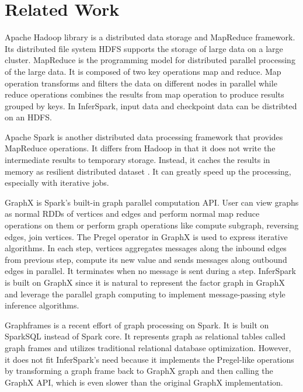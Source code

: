 
\chapter{Related Work}
\label{chap:related}

Apache Hadoop library  is a distributed data storage and
MapReduce framework. Its distributed file system HDFS supports the storage of
large data on a large cluster. MapReduce  is the programming model for
distributed parallel processing of the large data. It is composed of two key
operations map and reduce. Map operation transforms and filters the data on
different nodes in parallel while reduce operations combines the results from
map operation to produce results grouped by keys. In InferSpark, input data and
checkpoint data can be distribted on an HDFS.

Apache Spark is another distributed data processing framework that provides MapReduce
operations. It differs from Hadoop in that it does not write the intermediate
results to temporary storage. Instead, it caches the results in memory as
resilient distributed dataset . It
can greatly speed up the processing, especially with iterative jobs.

GraphX  is Spark's built-in graph
parallel computation API. User can view graphs as normal RDDs of vertices and
edges and perform normal map reduce operations on them or perform graph
operations like compute subgraph, reversing edges, join vertices. The Pregel
operator in GraphX is used to express iterative algorithms. In each step,
vertices aggregates messages along the inbound edges from previous step,
compute its new value and sends messages along outbound edges in parallel. It
terminates when no message is sent during a step. InferSpark is built on
GraphX since it is natural to represent the factor graph in GraphX and
leverage the parallel graph computing to implement message-passing style
inference algorithms. 

Graphframes  is a recent effort of graph processing on Spark. It is built on
SparkSQL instead of Spark core. It represents graph as relational tables
called graph frames and utilizes traditional relational database optimization.
However, it does not fit InferSpark's need because it implements the
Pregel-like operations by transforming a graph frame back to GraphX graph and
then calling the GraphX API, which is even slower than the original GraphX
implementation.

